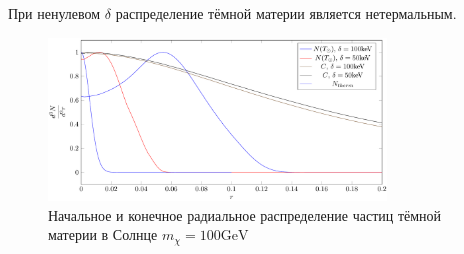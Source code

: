 При ненулевом $\delta$ распределение тёмной материи является нетермальным.
\begin{figure}[!h]
	\centering
	\includegraphics[width=0.8\textwidth]{images/Rdistribs.png}
	\caption{Начальное и конечное радиальное распределение частиц тёмной материи в Солнце $m_{\chi} = 100\text{GeV}$}
	\label{plot:Nrdistrib}
\end{figure}
